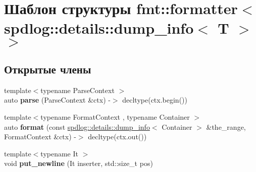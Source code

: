 \hypertarget{structfmt_1_1formatter_3_01spdlog_1_1details_1_1dump__info_3_01T_01_4_01_4}{}\section{Шаблон структуры fmt\+:\+:formatter$<$ spdlog\+:\+:details\+:\+:dump\+\_\+info$<$ T $>$ $>$}
\label{structfmt_1_1formatter_3_01spdlog_1_1details_1_1dump__info_3_01T_01_4_01_4}
\subsection*{Открытые члены}
\begin{DoxyCompactItemize}
\item 
\mbox{\label{structfmt_1_1formatter_3_01spdlog_1_1details_1_1dump__info_3_01T_01_4_01_4_a7083781a6fe9806537591674b352e805}} 
{\footnotesize template$<$typename Parse\+Context $>$ }\\auto {\bfseries parse} (Parse\+Context \&ctx) -\/$>$ decltype(ctx.\+begin())
\item 
\mbox{\label{structfmt_1_1formatter_3_01spdlog_1_1details_1_1dump__info_3_01T_01_4_01_4_a0b81f60fb0e6860e3b4edc6fb2df85ae}} 
{\footnotesize template$<$typename Format\+Context , typename Container $>$ }\\auto {\bfseries format} (const \hyperlink{classspdlog_1_1details_1_1dump__info}{spdlog\+::details\+::dump\+\_\+info}$<$ Container $>$ \&the\+\_\+range, Format\+Context \&ctx) -\/$>$ decltype(ctx.\+out())
\item 
\mbox{\label{structfmt_1_1formatter_3_01spdlog_1_1details_1_1dump__info_3_01T_01_4_01_4_a632a97d5371dbdeeb33b15f104ed8ff7}} 
{\footnotesize template$<$typename It $>$ }\\void {\bfseries put\+\_\+newline} (It inserter, std\+::size\+\_\+t pos)
\end{DoxyCompactItemize}
